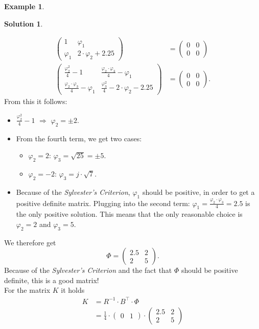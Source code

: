 \documentclass[a4paper,12 pt]{article}
\numberwithin{equation}{section}
\theoremstyle{definition}
\newtheorem{bsp}{Example}
\theoremstyle{remark}
\theoremstyle{definition}
\newtheorem*{lsg}{Solution}
\theoremstyle{definition}
\theoremstyle{definition}
\theoremstyle{remark}
\begin{document}
\begin{bsp}
\begin{lsg}
\begin{enumerate}[(a)]
\begin{equation*}
\begin{split}
\begin{pmatrix}
1&\varphi_1 \\
\varphi_1 & 2\cdot \varphi_2+2.25
\end{pmatrix}&=\begin{pmatrix} 0&0\\ 0&0 \end{pmatrix}\\
 \begin{pmatrix}
\frac{\varphi_2^2}{4}-1&\frac{\varphi_2\cdot \varphi_3}{4}-\varphi_1\\[6pt]
\frac{\varphi_2\cdot \varphi_3}{4}-\varphi_1 &\frac{\varphi_3^2}{4}-2\cdot \varphi_2-2.25
\end{pmatrix}&=\begin{pmatrix}0&0\\ 0&0\end{pmatrix}.
\end{split}
\end{equation*}
From this it follows:
\begin{itemize}
\item $\frac{\varphi_2^2}{4}-1$ $ \Rightarrow$ $\varphi_2=\pm 2$. 
\item From the fourth term, we get two cases:
\begin{itemize}
\item $\varphi_2=2$: $\varphi_3=\sqrt{25}=\pm 5$.
\item $\varphi_2=-2$: $\varphi_3=j\cdot \sqrt{7}$. 
\end{itemize}
 \item Because of the \textit{Sylvester's Criterion}, $\varphi_1$ should be positive, in order to get a positive definite matrix. Plugging into the second term: $\varphi_1=\frac{\varphi_2\cdot \varphi_3}{4}=2.5$ is the only positive solution. This means that the only reasonable choice is $\varphi_2=2$ and $\varphi_3=5$.
\end{itemize}
We therefore get
\begin{equation*}
\Phi=\begin{pmatrix} 2.5&2\\ 2&5\end{pmatrix}.
\end{equation*}
Because of the \textit{Sylvester's Criterion} and the fact that $\Phi$ should be positive definite, this is a good matrix! \\
For the matrix $K$ it holds
\begin{equation*}
\begin{split}
 K&=R^{-1}\cdot B^\intercal\cdot \Phi\\
 &=\frac{1}{4}\cdot \begin{pmatrix} 0& 1 \end{pmatrix} \cdot \begin{pmatrix} 2.5&2\\ 2&5\end{pmatrix}\\

\end{split}
\end{equation*}
\end{enumerate}
\end{lsg}
\end{bsp}
\end{document}
